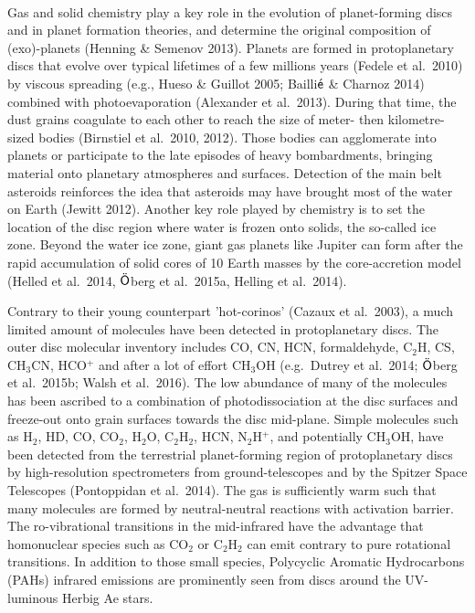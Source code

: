 \documentclass[10pt,fleqn,twoside]{article}
\begin{document}
\vspace{0.5em}\\
Gas and solid chemistry play a key role in the evolution of planet-forming discs and in planet formation theories, and determine the original composition of (exo)-planets (Henning \& Semenov 2013).  Planets are formed in protoplanetary discs that evolve over typical lifetimes of a few millions years (Fedele et al.\ 2010) by viscous spreading (e.g., Hueso \& Guillot 2005; Bailli$\acute{\textsf e}$ \& Charnoz 2014) combined with photoevaporation (Alexander et al.\ 2013). During that time, the dust grains coagulate to each other to reach the size of meter- then kilometre- sized bodies (Birnstiel et al.\ 2010, 2012). Those bodies can agglomerate into planets or participate to the late episodes of heavy bombardments, bringing material onto planetary atmospheres and surfaces. Detection of the main belt asteroids reinforces the idea that asteroids may have brought most of the water on Earth (Jewitt 2012). Another key role played by chemistry is to set the location of the disc region where water is frozen onto solids, the so-called ice zone. Beyond the water ice zone, giant gas planets like Jupiter can form after the rapid accumulation of solid cores of 10 Earth masses by the core-accretion model (Helled et al.\ 2014, $\ddot{\textsf O}$berg et al.\ 2015a, Helling et al.\ 2014).

Contrary to their young counterpart 'hot-corinos' (Cazaux et al.\ 2003), a much limited amount of molecules have been detected in protoplanetary discs. The outer disc molecular inventory includes CO, CN, HCN, formaldehyde, C$_2$H, CS, CH$_3$CN, HCO$^+$ and after a lot of effort CH$_3$OH (e.g.\ Dutrey et al.\ 2014;  $\ddot{\textsf O}$berg et al.\ 2015b; Walsh et al.\ 2016). The low abundance of many of the molecules has been ascribed to a combination of photodissociation at the disc surfaces and freeze-out onto grain surfaces towards the disc mid-plane. Simple molecules such as H$_2$, HD, CO, CO$_2$, H$_2$O, C$_2$H$_2$, HCN, N$_2$H$^+$, and potentially CH$_3$OH, have been detected from the terrestrial planet-forming region of protoplanetary discs by high-resolution spectrometers from ground-telescopes and by the Spitzer Space Telescopes (Pontoppidan et al.\ 2014). The gas is sufficiently warm such that many molecules are formed by neutral-neutral reactions with activation barrier. The ro-vibrational transitions in the mid-infrared have the advantage that homonuclear species such as CO$_2$ or C$_2$H$_2$ can emit contrary to pure rotational transitions. In addition to those small species, Polycyclic Aromatic Hydrocarbons (PAHs) infrared emissions are prominently seen from discs around the UV-luminous Herbig Ae stars. 
\end{document}
